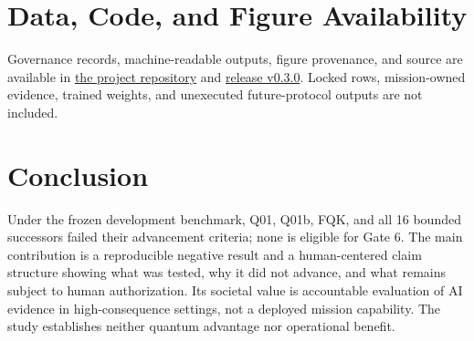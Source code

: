 \section{Data, Code, and Figure Availability}

Governance records, machine-readable outputs, figure provenance, and source are
available in \href{https://github.com/taechasith/QMLforArtemisIV}{the project
repository} and \href{https://github.com/taechasith/QMLforArtemisIV/releases/tag/v0.3.0}{release
v0.3.0}. Locked rows, mission-owned evidence, trained weights, and unexecuted
future-protocol outputs are not included.

\section{Conclusion}

Under the frozen development benchmark, Q01, Q01b, FQK, and all 16 bounded
successors failed their advancement criteria; none is eligible for Gate 6. The
main contribution is a reproducible negative result and a human-centered claim
structure showing what was tested, why it did not advance, and what remains
subject to human authorization. Its societal value is accountable evaluation
of AI evidence in high-consequence settings, not a deployed mission capability.
The study establishes neither quantum advantage nor operational benefit.

